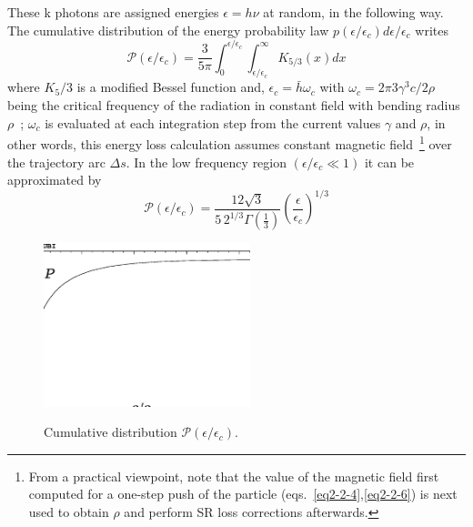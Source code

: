 These k photons are assigned energies $\epsilon=h\nu$ at random, in the following way. The cumulative 
distribution of the energy probability law $p(\epsilon/\epsilon_c)d\epsilon/\epsilon_c$  writes 
\begin{equation}
\label{EqSK53}
\mathcal{P}(\epsilon/\epsilon_c) = \frac{3}{5\pi} \int_0^{\epsilon/\epsilon_c} 
\int_{\epsilon/\epsilon_c}^\infty K_{5/3}(x) dx
\end{equation}
where $K_5/3$ is a modified Bessel function and, $\epsilon_c= \bar{h} \omega_c$
with $\omega_c=2 \pi 3 \gamma^3 c / 2 \rho$ being the critical frequency  of the radiation in 
constant field with bending radius $\rho$~;  $\omega_c$ is evaluated at each integration step from 
the current values $\gamma$ and $\rho$, in other words, this energy loss calculation 
assumes constant  magnetic field~\footnote{From 
a practical viewpoint, note that the value of the magnetic field first computed for a 
one-step push of the particle  (eqs.~\ref{eq2-2-4},\ref{eq2-2-6}) is next used to  obtain  
$\rho$ and perform SR loss corrections afterwards.}  over the trajectory arc $\Delta s$. 
In the low frequency region $(\epsilon/\epsilon_c \ll 1)$ it can be approximated by 
\begin{equation}
\label{EqSK53Low}
\mathcal{P}(\epsilon/\epsilon_c) = \frac{12 \sqrt{3}}{5\, 2^{1/3} \Gamma(\frac{1}{3})}  
(\frac{\epsilon}{\epsilon_c})^{1/3}
\end{equation}


\begin{figure}

\vspace{5mm}  \centerline{\includegraphics[width=6cm]{G.eps}}

\vspace{4mm}
  \begin{center} 
 {\footnotesize 
       Cumulative distribution   $\mathcal{P}(\epsilon/\epsilon_c)$. }
  \end{center} 

\vspace{-6mm}
\end{figure}

